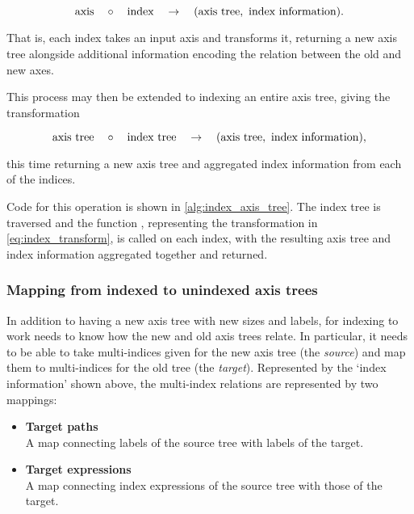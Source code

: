 \documentclass[thesis]{subfiles}
\begin{document}
\begin{equation}
  \textnormal{axis} \quad \circ \quad \textnormal{index} \quad \to \quad (\textnormal{axis tree},\ \textnormal{index information}).
  \label{eq:index_transform}
\end{equation}

\noindent
That is, each index takes an input axis and transforms it, returning a new axis tree alongside additional information encoding the relation between the old and new axes.

This process may then be extended to indexing an entire axis tree, giving the transformation

\begin{equation}
  \textnormal{axis tree} \quad \circ \quad \textnormal{index tree} \quad \to \quad (\textnormal{axis tree},\ \textnormal{index information}),
\end{equation}

\noindent
this time returning a new axis tree and aggregated index information from each of the indices.

Code for this operation is shown in \cref{alg:index_axis_tree}.
The index tree is traversed and the function , representing the transformation in \cref{eq:index_transform}, is called on each index, with the resulting axis tree and index information aggregated together and returned.

\subsubsection{Mapping from indexed to unindexed axis trees}

In addition to having a new axis tree with new sizes and labels, for indexing to work  needs to know how the new and old axis trees relate.
In particular, it needs to be able to take multi-indices given for the new axis tree (the \emph{source}) and map them to multi-indices for the old tree (the \emph{target}).
Represented by the `index information' shown above, the multi-index relations are represented by two mappings:

\begin{itemize}
  \item
    \textbf{Target paths} \\
    A map connecting labels of the source tree with labels of the target.
  \item
    \textbf{Target expressions} \\
    A map connecting index expressions of the source tree with those of the target.
\end{itemize}
\end{document}
